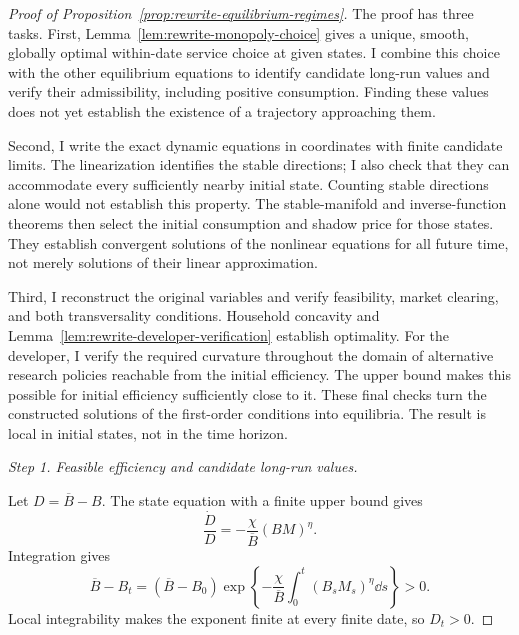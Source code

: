 \label{app:rewrite-finite-existence}
\label{proof:rewrite-equilibrium-regimes}
\begin{proof}[Proof of Proposition~\ref{prop:rewrite-equilibrium-regimes}]

The proof has three tasks. First, Lemma~\ref{lem:rewrite-monopoly-choice}
gives a unique, smooth, globally optimal within-date service choice at given
states. I combine this choice with the other equilibrium equations to
identify candidate long-run values and verify their admissibility, including
positive consumption. Finding these values does not yet establish the
existence of a trajectory approaching them.

Second, I write the exact dynamic equations in coordinates with finite
candidate limits. The linearization identifies the stable directions; I
also check that they can accommodate every sufficiently nearby initial
state. Counting stable directions alone would not establish this property.
The stable-manifold and inverse-function theorems then select the initial
consumption and shadow price for those states. They establish convergent
solutions of the nonlinear equations for all future time, not merely
solutions of their linear approximation.

Third, I reconstruct the original variables and verify feasibility,
market clearing, and both transversality conditions. Household concavity
and Lemma~\ref{lem:rewrite-developer-verification} establish optimality.
For the developer, I verify the required curvature throughout the domain
of alternative research policies reachable from the initial efficiency.
The upper bound makes this possible for initial efficiency sufficiently
close to it. These final checks turn the constructed solutions of the
first-order conditions into equilibria. The result is local in initial
states, not in the time horizon.

\par\medskip\noindent\textit{Step 1. Feasible efficiency and candidate long-run values.}

Let \(D=\overline B-B\). The state equation with a finite upper bound gives
\[
 \frac{\dot D}{D}=-\frac{\chi}{\overline B}(BM)^\eta.
\]
Integration gives
\begin{equation}
 \overline B-B_t=(\overline B-B_0)
 \exp\left\{-\frac{\chi}{\overline B}
 \int_0^t(B_sM_s)^\eta\dd s\right\}>0.
 \label{eq:rewrite-cap-gap}
\end{equation}
Local integrability makes the exponent finite at every finite date, so
\(D_t>0\).


\end{proof}
